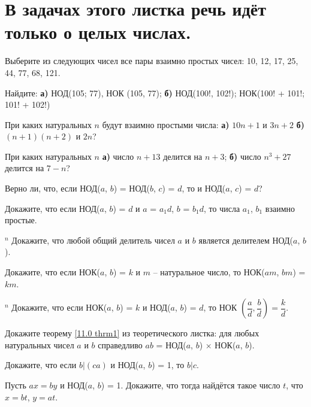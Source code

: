 
\section{В задачах этого листка речь идёт только о целых числах.}

\begin{thm}
     Выберите из следующих чисел все пары взаимно простых чисел: 10, 12, 17, 25, 44, 77, 68, 121.
\end{thm}

\begin{thm}
    Найдите: \textbf{а)} НОД(105; 77), НОК (105, 77); \textbf{б)} НОД(100!, 102!); НОК(100! + 101!; 101! + 102!)
\end{thm}

\begin{thm}
    При каких натуральных $n$ будут взаимно простыми числа: \textbf{а)} $10n + 1$ и $3n + 2$ \textbf{б)} $(n + 1)(n + 2)$ и $2n$?
\end{thm}

\begin{thm}
    При каких натуральных $n$ \textbf{а)} число $n + 13$ делится на $n + 3$; \textbf{б)} число $n^3 + 27$ делится на $7 - n$?
\end{thm}

\begin{thm}
    Верно ли, что, если НОД($a$, $b$) = НОД($b$, $c$) = $d$, то и НОД($a$, $c$) = $d$?
\end{thm}

\begin{thm}
    Докажите, что если НОД($a$, $b$) = $d$ и $a$ = $a_1d$, $b$ = $b_1d$, то числа $a_1$, $b_1$ взаимно простые.
\end{thm}

\begin{thm} $^n$
    Докажите, что любой общий делитель чисел $a$ и $b$ является делителем НОД($a$, $b$).
\end{thm}

\begin{thm}
    Докажите, что если НОК($a$, $b$) = $k$ и $m$ -- натуральное число, то НОК($am$, $bm$) = $km$.
\end{thm}

\begin{thm} $^n$
    Докажите, что если НОК($a$, $b$) = $k$ и НОД($a$, $b$) = $d$, то НОК $\left( \dfrac{a}{d}, \dfrac{b}{d} \right) = \dfrac{k}{d}$.
\end{thm}

\begin{thm}
    Докажите теорему \ref{11.0 thrm1} из теоретического листка: для любых натуральных чисел $a$ и $b$ справедливо $ab$ = НОД($a$, $b$) $\times$ НОК($a$, $b$).
\end{thm}

\begin{thm}
    Докажите, что если $b | (ca)$ и НОД($a$, $b$) = 1, то $b | c$.
\end{thm}

\begin{thrm}
    Пусть $ax = by$ и НОД($a$, $b$) = 1. Докажите, что тогда найдётся такое число $t$, что $x = bt$, $y = at$.
\end{thrm}